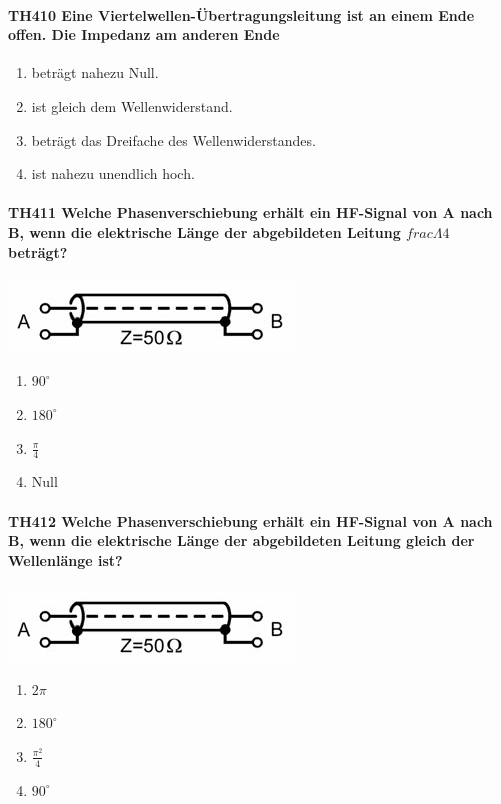 \documentclass[8pt]{article}
\begin{document}
\paragraph*{TH410 Eine Viertelwellen-Übertragungsleitung ist an einem Ende offen. Die Impedanz am anderen Ende} 
\begin{enumerate}[nolistsep,label=\Alph*]
\item beträgt nahezu Null.
\item ist gleich dem Wellenwiderstand.
\item beträgt das Dreifache des Wellenwiderstandes.
\item ist nahezu unendlich hoch.
\end{enumerate}

\paragraph*{TH411 Welche Phasenverschiebung erhält ein HF-Signal von A nach B, wenn die elektrische Länge der abgebildeten Leitung $frac{\Lambda}{4}$ beträgt?}
\begin{center}
	\begin{minipage}{\linewidth}
		\centering
		\includegraphics[scale=1.0]{pics/th411_a.jpg}
	\end{minipage}
\end{center}
\begin{enumerate}[nolistsep,label=\Alph*]
\item $90^{\circ}$
\item $180^{\circ}$
\item $\frac{\pi}{4}$
\item Null
\end{enumerate}

\paragraph*{TH412 Welche Phasenverschiebung erhält ein HF-Signal von A nach B, wenn die elektrische Länge der abgebildeten Leitung gleich der Wellenlänge ist?} 
\begin{center}
	\begin{minipage}{\linewidth}
		\centering
		\includegraphics[scale=1.0]{pics/th412_a.jpg}
	\end{minipage}
\end{center}
\begin{enumerate}[nolistsep,label=\Alph*]
\item $2\pi$
\item $180^{\circ}$
\item $\frac{\pi^{2}}{4}$
\item $90^{\circ}$
\end{enumerate}
\end{document}
